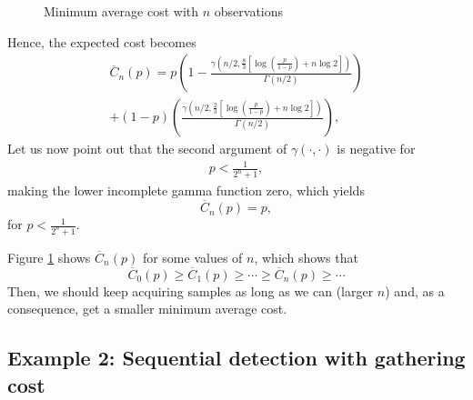 \begin{figure}[t]
	\begin{center}
		
	\end{center}
	\caption{Minimum average cost with $n$ observations}
	\label{fig:average_cost_n}
\end{figure}
Hence, the expected cost becomes
\begin{multline}
	\overline{C}_n(p) = p \left(1 - \frac{\gamma \left(n/2,\frac{8}{3} \left[\log \left(\frac{p}{1 - p}  \right) + n \log 2 \right]\right)}{\Gamma(n/2)}\right) \\ + (1 - p) \left(\frac{\gamma \left(n/2,\frac{2}{3} \left[\log \left(\frac{p}{1 - p}  \right) + n \log 2 \right]\right)}{\Gamma(n/2)}\right), \label{eq:cost_n_nogathering}
\end{multline}
Let us now point out that the second argument of $\gamma \left(\cdot, \cdot\right)$ is negative for
\begin{align*}
	p < \frac{1}{2^n + 1},
\end{align*}
making the lower incomplete gamma function zero, which yields
\begin{equation*}
	\overline{C}_n(p) = p,
\end{equation*}
for $p < \frac{1}{2^n + 1}$.

Figure \ref{fig:average_cost_n} shows $\overline{C}_n(p)$ for some values of $n$, which shows that
\begin{equation*}
	\overline{C}_0(p)  \geq \overline{C}_1(p) \geq \cdots \geq \overline{C}_n(p) \geq \cdots
\end{equation*}
Then, we should keep acquiring samples as long as we can (larger $n$) and, as a consequence, get a smaller minimum average cost.

\subsection{Example 2: Sequential detection with gathering cost}

